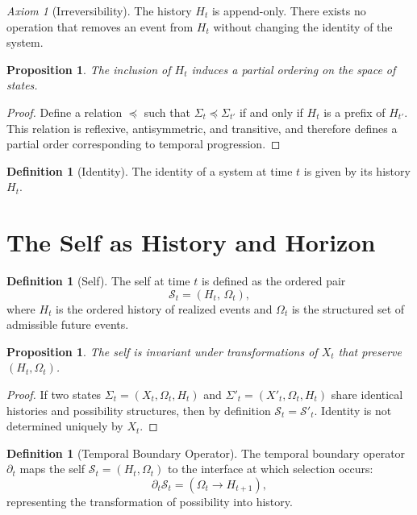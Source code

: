 \documentclass[11pt,a4paper]{article}
\newtheorem{proposition}[theorem]{Proposition}
\theoremstyle{definition}
\newtheorem{definition}[theorem]{Definition}
\theoremstyle{remark}
\newtheorem{axiom}[theorem]{Axiom}
\begin{document}
\begin{axiom}[Irreversibility]
The history $H_t$ is append-only. There exists no operation that removes an event from $H_t$ without changing the identity of the system.
\end{axiom}

\begin{proposition}
The inclusion of $H_t$ induces a partial ordering on the space of states.
\end{proposition}

\begin{proof}
Define a relation $\preceq$ such that $\Sigma_t \preceq \Sigma_{t'}$ if and only if $H_t$ is a prefix of $H_{t'}$. This relation is reflexive, antisymmetric, and transitive, and therefore defines a partial order corresponding to temporal progression.
\end{proof}

\begin{definition}[Identity]
The identity of a system at time $t$ is given by its history $H_t$.
\end{definition}

\section{The Self as History and Horizon}

\begin{definition}[Self]
The self at time $t$ is defined as the ordered pair
\[
\mathcal{S}_t = (H_t,\, \Omega_t),
\]
where $H_t$ is the ordered history of realized events and $\Omega_t$ is the structured set of admissible future events.
\end{definition}

\begin{proposition}
The self is invariant under transformations of $X_t$ that preserve $(H_t, \Omega_t)$.
\end{proposition}

\begin{proof}
If two states $\Sigma_t = (X_t, \Omega_t, H_t)$ and $\Sigma'_t = (X'_t, \Omega_t, H_t)$ share identical histories and possibility structures, then by definition $\mathcal{S}_t = \mathcal{S}'_t$. Identity is not determined uniquely by $X_t$.
\end{proof}

\begin{definition}[Temporal Boundary Operator]
The temporal boundary operator $\partial_t$ maps the self $\mathcal{S}_t = (H_t, \Omega_t)$ to the interface at which selection occurs:
\[
\partial_t \mathcal{S}_t = (\Omega_t \rightarrow H_{t+1}),
\]
representing the transformation of possibility into history.
\end{definition}
\end{document}
